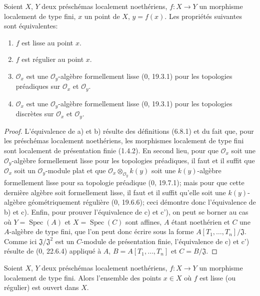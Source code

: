 \begin{theorem}[6.8.6]
\label{IV.2.s6.8.6-fr}
Soient $X$, $Y$ deux préschémas localement noethériens, $f:X\to Y$ un
morphisme localement de type fini, $x$ un point de $X$, $y=f(x)$. Les
propriétés suivantes sont équivalentes:
\begin{enumerate}
\item[a)] $f$ est lisse au point $x$.
\item[b)] $f$ est régulier au point $x$.
\item[c)] $\mathcal O_x$ est une $\mathcal O_y$-algèbre formellement lisse
(0, 19.3.1) pour les topologies préadiques sur $\mathcal O_x$ et $\mathcal O_y$.
\item[c')] $\mathcal O_x$ est une $\mathcal O_y$-algèbre formellement lisse
(0, 19.3.1) pour les topologies discrètes sur $\mathcal O_x$ et $\mathcal O_y$.
\end{enumerate}
\end{theorem}

\begin{proof}
L'équivalence de a) et b) résulte des définitions (6.8.1) et du fait que,
pour les préschémas localement noethériens, les morphismes localement de type
fini sont localement de présentation finie (1.4.2). En second lieu, pour que
$\mathcal O_x$ soit une $\mathcal O_y$-algèbre formellement lisse pour les
topologies préadiques, il faut et il suffit que $\mathcal O_x$ soit un
$\mathcal O_y$-module plat et que $\mathcal O_x\otimes_{\mathcal O_y}k(y)$
soit une $k(y)$-algèbre formellement lisse pour sa topologie préadique
(0, 19.7.1); mais pour que cette dernière algèbre soit formellement lisse,
il faut et il suffit qu'elle soit une $k(y)$-algèbre géométriquement régulière
(0, 19.6.6); ceci démontre donc l'équivalence de b) et c). Enfin, pour prouver
l'équivalence de c) et c'), on peut se borner au cas où $Y=\operatorname{Spec}(A)$
et $X=\operatorname{Spec}(C)$ sont affines, $A$ étant noethérien et $C$ une
$A$-algèbre de type fini, que l'on peut donc écrire sous la forme
$A[T_1,\ldots,T_n]/\mathfrak J$. Comme ici $\mathfrak J/\mathfrak J^2$ est un
$C$-module de présentation finie, l'équivalence de c) et c') résulte de
(0, 22.6.4) appliqué à $A$, $B=A[T_1,\ldots,T_n]$ et $C=B/\mathfrak J$.
\end{proof}

\begin{corollary}[6.8.7]
\label{IV.2.s6.8.7-fr}
Soient $X$, $Y$ deux préschémas localement noethériens, $f:X\to Y$ un
morphisme localement de type fini. Alors l'ensemble des points $x\in X$ où
$f$ est lisse (ou régulier) est ouvert dans $X$.
\end{corollary}

